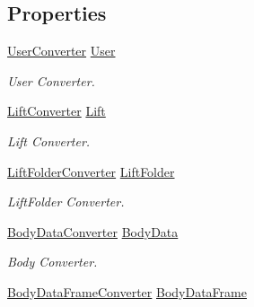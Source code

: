 \subsection*{Properties}
\begin{DoxyCompactItemize}
\item 
\mbox{\hyperlink{class_bar_none_1_1_shared_1_1_data_converters_1_1_user_converter}{User\+Converter}} \mbox{\hyperlink{class_bar_none_1_1_shared_1_1_data_converters_1_1_converters_a908e9af09df694f1c48136bf86c46136}{User}}
\begin{DoxyCompactList}\small\item\em User Converter. \end{DoxyCompactList}\item 
\mbox{\hyperlink{class_bar_none_1_1_shared_1_1_data_converters_1_1_lift_converter}{Lift\+Converter}} \mbox{\hyperlink{class_bar_none_1_1_shared_1_1_data_converters_1_1_converters_ade7bab437b981aada9c7142354807718}{Lift}}
\begin{DoxyCompactList}\small\item\em Lift Converter. \end{DoxyCompactList}\item 
\mbox{\hyperlink{class_bar_none_1_1_shared_1_1_data_converters_1_1_lift_folder_converter}{Lift\+Folder\+Converter}} \mbox{\hyperlink{class_bar_none_1_1_shared_1_1_data_converters_1_1_converters_a93ac2586c6cde38ba4338fa8c1b9abb3}{Lift\+Folder}}
\begin{DoxyCompactList}\small\item\em Lift\+Folder Converter. \end{DoxyCompactList}\item 
\mbox{\hyperlink{class_bar_none_1_1_shared_1_1_data_converters_1_1_body_data_converter}{Body\+Data\+Converter}} \mbox{\hyperlink{class_bar_none_1_1_shared_1_1_data_converters_1_1_converters_aa4cfd37c858da62a4428571b25728b32}{Body\+Data}}
\begin{DoxyCompactList}\small\item\em Body Converter. \end{DoxyCompactList}\item 
\mbox{\hyperlink{class_bar_none_1_1_shared_1_1_data_converters_1_1_body_data_frame_converter}{Body\+Data\+Frame\+Converter}} \mbox{\hyperlink{class_bar_none_1_1_shared_1_1_data_converters_1_1_converters_a28037be257d7aaebe212da7983508430}{Body\+Data\+Frame}}

\end{DoxyCompactItemize}
